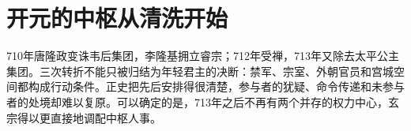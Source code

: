 \section{开元的中枢从清洗开始} \label{sec:xuanzong-frontiers}  710年唐隆政变诛韦后集团，李隆基拥立睿宗；712年受禅，713年又除去太平公主集团。三次转折不能只被归结为年轻君主的决断：禁军、宗室、外朝官员和宫城空间都构成行动条件。正史把先后安排得很清楚，参与者的犹疑、命令传递和未参与者的处境却难以复原。可以确定的是，713年之后不再有两个并存的权力中心，玄宗得以更直接地调配中枢人事。%